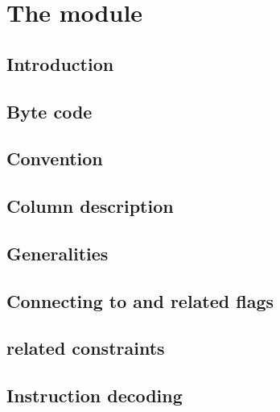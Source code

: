 
\section{The \romMod{} module}                                   \label{rom}
\subsection{Introduction}                                        \label{rom: intro}                        
\subsection{Byte code}                                           \label{rom: byte code}                    
\subsection{Convention}                                          \label{rom: convention}                   
\subsection{Column description}                                  \label{rom: columns}                      
\subsection{Generalities}                                        \label{rom: constraints}                  
\subsection{Connecting \romColumnLimbByte{} to \romColumnOpcode{} and related flags}      \label{rom: opcode related constraints}   
\subsection{ related constraints}                     \label{rom: push related constraints}     
\subsection{Instruction decoding}                                \label{rom: instruction decoding}         
